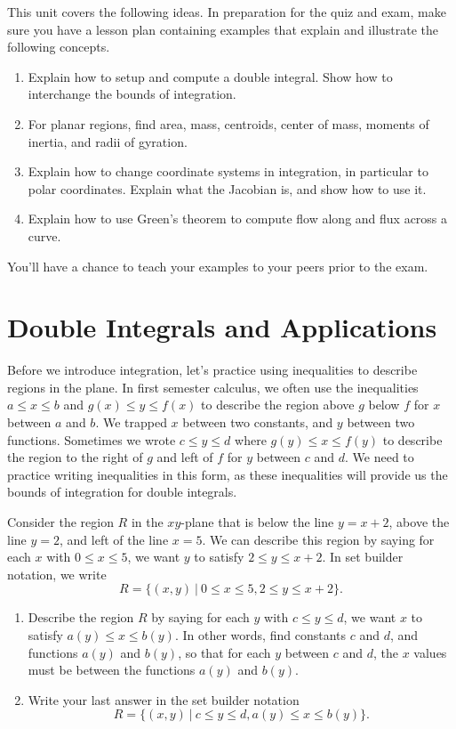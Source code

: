 
\noindent 
This unit covers the following ideas. In preparation for the quiz and exam, make sure you have a lesson plan containing examples that explain and illustrate the following concepts.  
\begin{enumerate}
\item Explain how to setup and compute a double integral. Show how to interchange the bounds of integration.
\item For planar regions, find area, mass, centroids, center of mass, moments of inertia, and radii of gyration.
\item Explain how to change coordinate systems in integration, in particular to polar coordinates. Explain what the Jacobian is, and show how to use it.
\item Explain how to use Green's theorem to compute flow along and flux across a curve.
\end{enumerate}
You'll have a chance to teach your examples to your peers prior to the exam.

\section{Double Integrals and Applications}

Before we introduce integration, let's practice using inequalities to describe regions in the plane.  In first semester calculus, we often use the inequalities $a\leq x\leq b$ and $g(x)\leq y\leq f(x)$ to describe the region above $g$ below $f$ for $x$ between $a$ and $b$.  We trapped $x$ between two constants, and $y$ between two functions.  Sometimes we wrote $c\leq y\leq d$ where $g(y)\leq x\leq f(y)$ to describe the region to the right of $g$ and left of $f$ for $y$ between $c$ and $d$. We need to practice writing inequalities in this form, as these inequalities will provide us the bounds of integration for double integrals.  

\begin{problem}
 Consider the region $R$ in the $xy$-plane that is below the line $y=x+2$, above the line $y=2$, and left of the line $x=5$. We can describe this region by saying for each $x$ with $0\leq x\leq 5$, we want $y$ to satisfy $2\leq y\leq x+2$. In set builder notation, we write
$$R=\{(x,y)\ | \ 0\leq x\leq 5, 2\leq y\leq x+2\}.$$
\begin{enumerate}
 \item Describe the region $R$ by saying for each $y$ with $c\leq y\leq d$, we want $x$ to satisfy $a(y)\leq x\leq b(y)$. In other words, find constants $c$ and $d$, and functions $a(y)$ and $b(y)$, so that for each $y$ between $c$ and $d$, the $x$ values must be between the functions $a(y)$ and $b(y)$.
 \item Write your last answer in the set builder notation
$$R=\{(x,y)\ | \ c\leq y\leq d, a(y)\leq x\leq b(y)\}.$$
\end{enumerate}
\end{problem}

